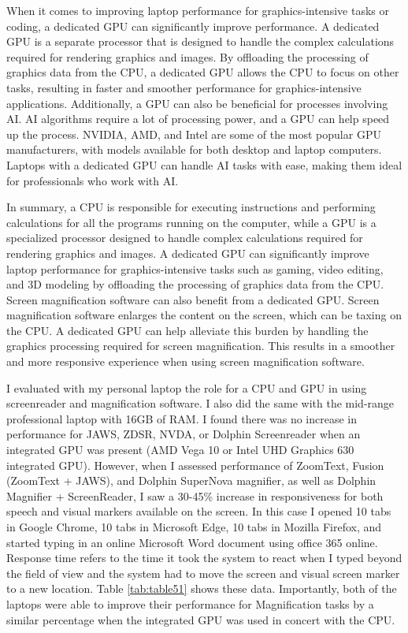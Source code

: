 	When it comes to improving laptop performance for graphics-intensive tasks or coding, a dedicated GPU can significantly improve performance. A dedicated GPU is a separate processor that is designed to handle the complex calculations required for rendering graphics and images. By offloading the processing of graphics data from the CPU, a dedicated GPU allows the CPU to focus on other tasks, resulting in faster and smoother performance for graphics-intensive applications. Additionally, a GPU can also be beneficial for processes involving AI. AI algorithms require a lot of processing power, and a GPU can help speed up the process. NVIDIA, AMD, and Intel are some of the most popular GPU manufacturers, with models available for both desktop and laptop computers. Laptops with a dedicated GPU can handle AI tasks with ease, making them ideal for professionals who work with AI.
	
	In summary, a CPU is responsible for executing instructions and performing calculations for all the programs running on the computer, while a GPU is a specialized processor designed to handle complex calculations required for rendering graphics and images. A dedicated GPU can significantly improve laptop performance for graphics-intensive tasks such as gaming, video editing, and 3D modeling by offloading the processing of graphics data from the CPU. Screen magnification software can also benefit from a dedicated GPU. Screen magnification software enlarges the content on the screen, which can be taxing on the CPU. A dedicated GPU can help alleviate this burden by handling the graphics processing required for screen magnification. This results in a smoother and more responsive experience when using screen magnification software.
	
	I evaluated with my personal laptop the role for a CPU and GPU in using screenreader and magnification software. I also did the same with the mid-range professional laptop with 16GB of RAM. I found there was no increase in performance for JAWS, ZDSR, NVDA, or Dolphin Screenreader when an integrated GPU was present (AMD Vega 10 or Intel UHD Graphics 630 integrated GPU). However, when I assessed performance of ZoomText, Fusion (ZoomText + JAWS), and Dolphin SuperNova magnifier, as well as Dolphin Magnifier + ScreenReader, I saw a 30-45\% increase in responsiveness for both speech and visual markers available on the screen. In this case I opened 10 tabs in Google Chrome, 10 tabs in Microsoft Edge, 10 tabs in Mozilla Firefox, and started typing in an online Microsoft Word document using office 365 online. Response time refers to the time it took the system to react when I typed beyond the field of view and the system had to move the screen and visual screen marker to a new location. Table \ref{tab:table51} shows these data. Importantly, both of the laptops were able to improve their performance for Magnification tasks by a similar percentage when the integrated GPU was used in concert with the CPU.
	
